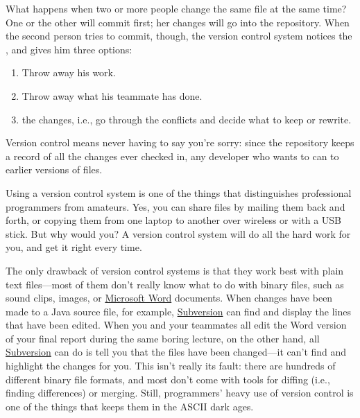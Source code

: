 \documentclass{report}
\begin{document}
\begin{figure}
\end{figure}

What happens when two or more people change the same file at the same
time?  One or the other will commit first; her changes will go into
the repository.  When the second person tries to commit, though, the
version control system notices the , and gives him
three options:

\begin{enumerate}

  \item Throw away his work.

  \item Throw away what his teammate has done.

  \item {} the changes, i.e., go through the conflicts
  and decide what to keep or rewrite.

\end{enumerate}

Version control means never having to say you're sorry: since the
repository keeps a record of all the changes ever checked in, any
developer who wants to can  to earlier versions of
files.

Using a version control system is one of the things that distinguishes
professional programmers from amateurs.  Yes, you can share files by
mailing them back and forth, or copying them from one laptop to
another over wireless or with a USB stick.  But why would you?  A
version control system will do all the hard work for you, and get it
right every time.

The only drawback of version control systems is that they work best
with plain text files---most of them don't really know what to do with
binary files, such as sound clips, images, or \url{Microsoft Word}
documents.  When changes have been made to a Java source file, for
example, \url{Subversion} can find and display the lines that have
been edited.  When you and your teammates all edit the Word version of
your final report during the same boring lecture, on the other hand,
all \url{Subversion} can do is tell you that the files have been
changed---it can't find and highlight the changes for you.  This isn't
really its fault: there are hundreds of different binary file formats,
and most don't come with tools for diffing (i.e., finding differences)
or merging.  Still, programmers' heavy use of version control is one
of the things that keeps them in the ASCII dark ages.
\end{document}
